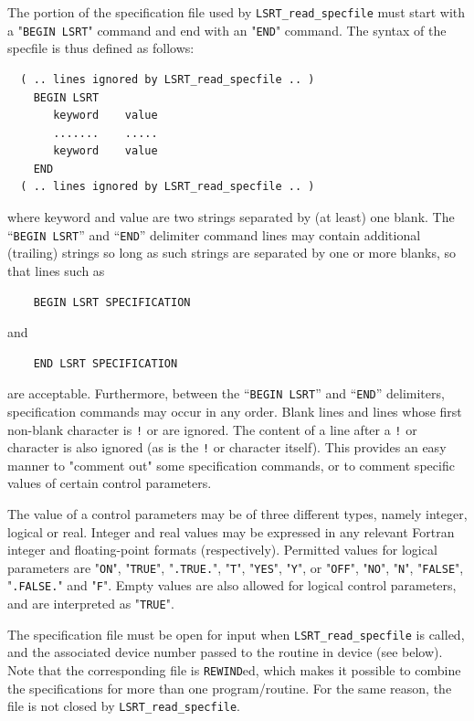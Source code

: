 \documentclass{galahad}
\newcommand{\packagename}{LS\-RT}
\begin{document}
The portion of the specification file used by
{\tt \packagename\_read\_specfile}
must start
with a "{\tt BEGIN \packagename}" command and end with an
"{\tt END}" command.  The syntax of the specfile is thus defined as follows:
\begin{verbatim}
  ( .. lines ignored by LSRT_read_specfile .. )
    BEGIN LSRT
       keyword    value
       .......    .....
       keyword    value
    END
  ( .. lines ignored by LSRT_read_specfile .. )
\end{verbatim}
where keyword and value are two strings separated by (at least) one blank.
The ``{\tt BEGIN \packagename}'' and ``{\tt END}'' delimiter command lines
may contain additional (trailing) strings so long as such strings are
separated by one or more blanks, so that lines such as
\begin{verbatim}
    BEGIN LSRT SPECIFICATION
\end{verbatim}
and
\begin{verbatim}
    END LSRT SPECIFICATION
\end{verbatim}
are acceptable. Furthermore,
between the
``{\tt BEGIN \packagename}'' and ``{\tt END}'' delimiters,
specification commands may occur in any order.  Blank lines and
lines whose first non-blank character is {\tt !} or {\tt *} are ignored.
The content
of a line after a {\tt !} or {\tt *} character is also
ignored (as is the {\tt !} or {\tt *}
character itself). This provides an easy manner to "comment out" some
specification commands, or to comment specific values
of certain control parameters.

The value of a control parameters may be of three different types, namely
integer, logical or real.
Integer and real values may be expressed in any relevant Fortran integer and
floating-point formats (respectively). Permitted values for logical
parameters are "{\tt ON}", "{\tt TRUE}", "{\tt .TRUE.}", "{\tt T}",
"{\tt YES}", "{\tt Y}", or "{\tt OFF}", "{\tt NO}",
"{\tt N}", "{\tt FALSE}", "{\tt .FALSE.}" and "{\tt F}".
Empty values are also allowed for
logical control parameters, and are interpreted as "{\tt TRUE}".

The specification file must be open for
input when {\tt \packagename\_read\_specfile}
is called, and the associated device number
passed to the routine in device (see below).
Note that the corresponding
file is {\tt REWIND}ed, which makes it possible to combine the specifications
for more than one program/routine.  For the same reason, the file is not
closed by {\tt \packagename\_read\_specfile}.
\end{document}
